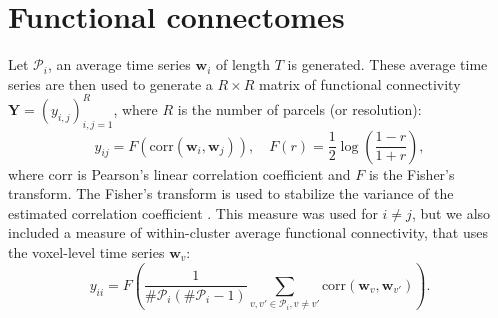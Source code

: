 \documentclass[authoryear,preprint,review]{elsarticle}
\begin{document}
\section{Functional connectomes}
\label{app_connectome}
Let $\mathcal{P}_i$, an average time series $\mathbf{w}_{i}$ of length $T$ is generated. These average time series are then used to generate a $R\times R$ matrix of functional connectivity $\mathbf{Y}=(y_{i,j})_{i,j=1}^R$, where $R$ is the number of parcels (or resolution):
\begin{equation}
 \label{eq_R}
 y_{ij} = F\left(\textrm{corr}(\mathbf{w}_i,\mathbf{w}_j)\right), \quad F(r) = \frac{1}{2}\log\left(\frac{1-r}{1+r}\right),
\end{equation}
where $\textrm{corr}$ is Pearson's linear correlation coefficient and $F$ is the Fisher's transform. The Fisher's transform is used to stabilize the variance of the estimated correlation coefficient \citep{Anderson1958}. This measure was used for $i\neq j$, but we also included a measure of within-cluster average functional connectivity, that uses the voxel-level time series $\mathbf{w}_v$:
\begin{equation}
y_{ii} = F\left(\frac{1}{\#\mathcal{P}_i(\#\mathcal{P}_i-1)}\sum_{v,v'\in\mathcal{P}_i,v\neq v'} \textrm{corr}(\mathbf{w}_v,\mathbf{w}_{v'})\right).
\end{equation}
\end{document}
